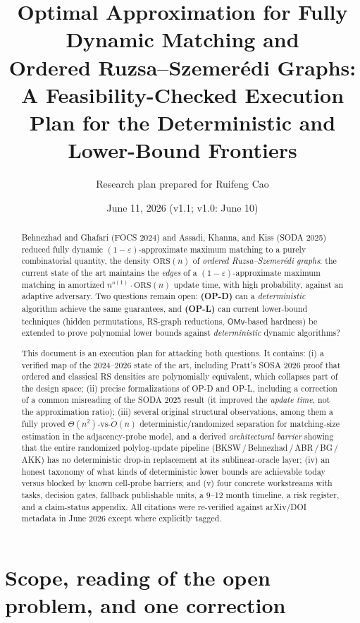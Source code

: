 \documentclass[11pt]{article}
\title{\bf Optimal Approximation for Fully Dynamic Matching and\\
Ordered Ruzsa--Szemer\'edi Graphs:\\[2pt]
\large A Feasibility-Checked Execution Plan for the Deterministic and\\
Lower-Bound Frontiers}
\author{Research plan prepared for Ruifeng Cao}
\date{June 11, 2026 (v1.1; v1.0: June 10)}
\theoremstyle{definition}
\theoremstyle{remark}
\newcommand{\ORS}{\mathrm{ORS}}
\newcommand{\OMv}{\mathsf{OMv}}
\newcommand{\eps}{\varepsilon}
\newcommand{\Otil}{\widetilde{O}}
\begin{document}
\maketitle

\begin{abstract}
\noindent
Behnezhad and Ghafari (FOCS 2024) and Assadi, Khanna, and Kiss (SODA 2025)
reduced fully dynamic $(1-\eps)$-approximate maximum matching to a purely
combinatorial quantity, the density $\ORS(n)$ of \emph{ordered
Ruzsa--Szemer\'edi graphs}: the current state of the art maintains the
\emph{edges} of a $(1-\eps)$-approximate maximum matching in amortized
$n^{o(1)}\cdot \ORS(n)$ update time, with high probability, against an
adaptive adversary. Two questions remain open: \textbf{(OP-D)} can a
\emph{deterministic} algorithm achieve the same guarantees, and
\textbf{(OP-L)} can current lower-bound techniques (hidden permutations,
RS-graph reductions, $\OMv$-based hardness) be extended to prove polynomial
lower bounds against \emph{deterministic} dynamic algorithms?

This document is an execution plan for attacking both questions. It
contains: (i) a verified map of the 2024--2026 state of the art, including
Pratt's SOSA 2026 proof that ordered and classical RS densities are
polynomially equivalent, which collapses part of the design space;
(ii) precise formalizations of OP-D and OP-L, including a correction of a
common misreading of the SODA 2025 result (it improved the \emph{update
time}, not the approximation ratio); (iii) several original structural
observations, among them a fully proved $\Theta(n^2)$-vs-$\Otil(n)$
deterministic/randomized separation for matching-size estimation in the
adjacency-probe model, and a derived \emph{architectural barrier} showing
that the entire randomized polylog-update pipeline
(BKSW\,/\,Behnezhad\,/\,ABR\,/\,BG\,/\,AKK) has no deterministic drop-in
replacement at its sublinear-oracle layer; (iv) an honest taxonomy of what
kinds of deterministic lower bounds are achievable today versus blocked by
known cell-probe barriers; and (v) four concrete workstreams with tasks,
decision gates, fallback publishable units, a 9--12 month timeline, a risk
register, and a claim-status appendix. All citations were re-verified
against arXiv/DOI metadata in June 2026 except where explicitly tagged.
\end{abstract}

\tableofcontents

\section{Scope, reading of the open problem, and one correction}
\label{sec:scope}
\end{document}
